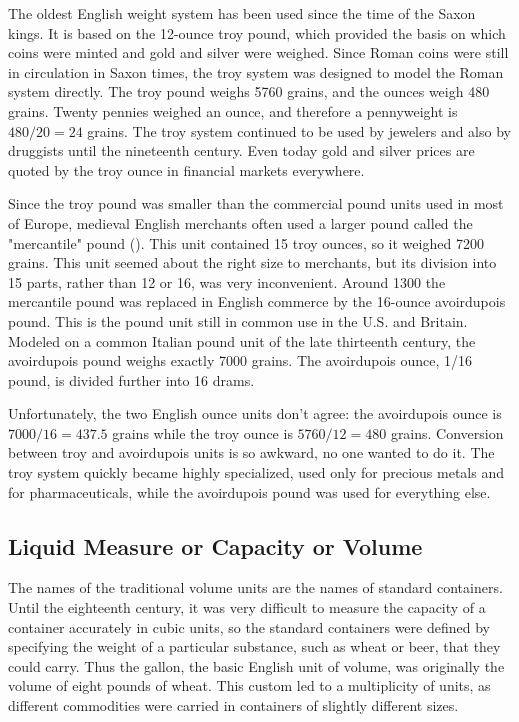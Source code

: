 The oldest English weight system has been used since the time of the Saxon kings. It
is based on the 12-ounce troy pound, which provided the basis on which coins were minted
and gold and silver were weighed. Since Roman coins were still in circulation in Saxon times,
the troy system was designed to model the Roman system directly. The troy pound weighs
5760 grains, and the ounces weigh 480 grains. Twenty pennies weighed an ounce, and
therefore a pennyweight is $480/20 = 24$ grains. The troy system continued to be used by
jewelers and also by druggists until the nineteenth century. Even today gold and silver prices
are quoted by the troy ounce in financial markets everywhere.

Since the troy pound was smaller than the commercial pound units used in most of
Europe, medieval English merchants often used a larger pound called the "mercantile"
pound (). This unit contained 15 troy ounces, so it weighed 7200 grains. This
unit seemed about the right size to merchants, but its division into 15 parts, rather than 12
or 16, was very inconvenient. Around 1300 the mercantile pound was replaced in English
commerce by the 16-ounce avoirdupois pound. This is the pound unit still in common use in
the U.S. and Britain. Modeled on a common Italian pound unit of the late thirteenth century,
the avoirdupois pound weighs exactly 7000 grains. The avoirdupois ounce, 1/16 pound, is
divided further into 16 drams.

Unfortunately, the two English ounce units don't agree: the avoirdupois ounce is
$7000/16 = 437.5$ grains while the troy ounce is $5760/12 = 480$ grains. Conversion between
troy and avoirdupois units is so awkward, no one wanted to do it. The troy system quickly
became highly specialized, used only for precious metals and for pharmaceuticals, while the
avoirdupois pound was used for everything else.

\subsection*{Liquid Measure or Capacity or Volume}
The names of the traditional volume units are the names of standard containers.
Until the eighteenth century, it was very difficult to measure the capacity of a container
accurately in cubic units, so the standard containers were defined by specifying the weight
of a particular substance, such as wheat or beer, that they could carry. Thus the gallon, the
basic English unit of volume, was originally the volume of eight pounds of wheat. This
custom led to a multiplicity of units, as different commodities were carried in containers of
slightly different sizes.

